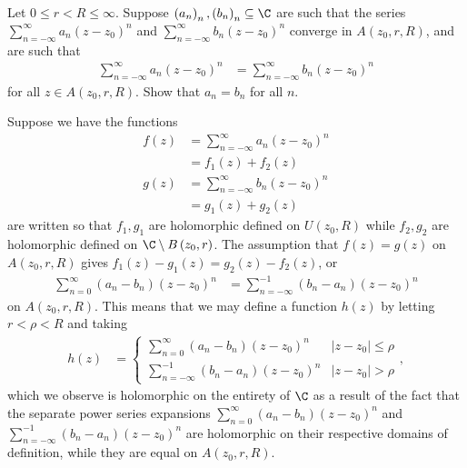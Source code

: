 \documentclass[10pt]{mypackage}
\begin{document}
\RaggedRight

\begin{problem}[Problem 1]
  Let $0\leq r < R \leq \infty$. Suppose $\left( a_n \right)_n,\left( b_n \right)_n\subseteq \C$ are such that the series $\sum_{n=-\infty}^{\infty}a_n\left( z-z_0 \right)^{n}$ and $\sum_{n=-\infty}^{\infty}b_n\left( z-z_0 \right)^{n}$ converge in $A\left( z_0,r,R \right)$, and are such that
  \begin{align*}
    \sum_{n=-\infty}^{\infty} a_n\left( z-z_0 \right)^{n} &= \sum_{n=-\infty}^{\infty}b_n\left( z-z_0 \right)^{n}
  \end{align*}
  for all $z\in A\left( z_0,r,R \right)$. Show that $a_n = b_n$ for all $n$.
\end{problem}
\begin{solution}
  Suppose we have the functions
  \begin{align*}
    f(z) &= \sum_{n=-\infty}^{\infty} a_n\left( z-z_0 \right)^{n}\\
         &= f_1(z) + f_2(z)\\
    g(z) &= \sum_{n=-\infty}^{\infty}b_n\left( z-z_0 \right)^{n}\\
         &= g_1(z) + g_2(z)
  \end{align*}
  are written so that $f_1,g_1$ are holomorphic defined on $U\left( z_0,R \right)$ while $f_2,g_2$ are holomorphic defined on $\C\setminus B\left( z_0,r \right)$. The assumption that $f(z) = g(z)$ on $A\left( z_0,r,R \right)$ gives $f_1(z) - g_1(z) = g_2(z) - f_2(z)$, or
  \begin{align*}
    \sum_{n=0}^{\infty} \left( a_n-b_n \right)\left( z-z_0 \right)^{n} &= \sum_{n=-\infty}^{-1} \left( b_n-a_n \right)\left( z-z_0 \right)^{n}
  \end{align*}
  on $A\left( z_0,r,R \right)$. This means that we may define a function $h(z)$ by letting $r < \rho < R$ and taking
  \begin{align*}
    h(z) &= \begin{cases}
      \sum_{n=0}^{\infty}\left( a_n-b_n \right)\left( z-z_0 \right)^{n} & \left\vert z-z_0 \right\vert\leq \rho\\
      \sum_{n=-\infty}^{-1}\left( b_n-a_n \right)\left( z-z_0 \right)^{n} & \left\vert z-z_0 \right\vert > \rho
    \end{cases},
  \end{align*}
  which we observe is holomorphic on the entirety of $\C$ as a result of the fact that the separate power series expansions $\sum_{n=0}^{\infty}\left( a_n-b_n \right)\left( z-z_0 \right)^{n}$ and $\sum_{n=-\infty}^{-1}\left( b_n-a_n \right)\left( z-z_0 \right)^{n}$ are holomorphic on their respective domains of definition, while they are equal on $A\left( z_0,r,R \right)$.\newline


\end{solution}
\end{document}
